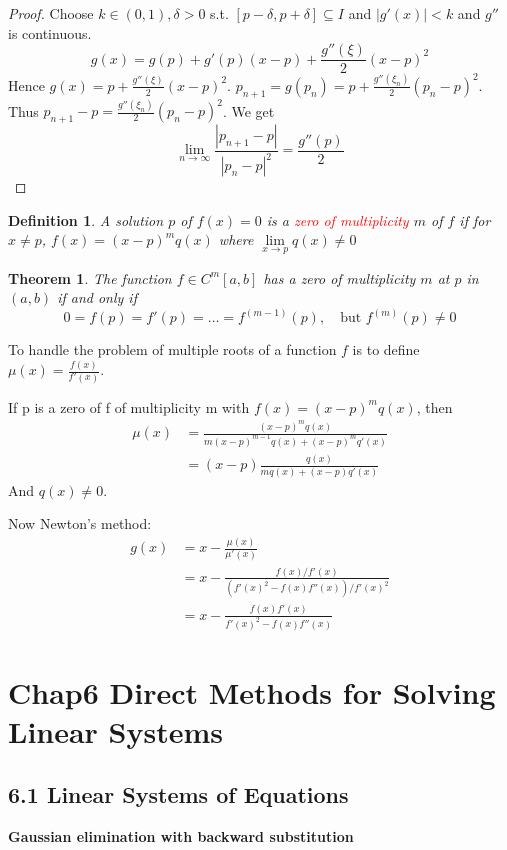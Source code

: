 \documentclass[11pt]{article}
\newtheorem{theorem}{Theorem}[section]
\newtheorem{definition}{Definition}[section]
\begin{document}
\begin{proof}
Choose $k\in(0,1),\delta>0$ s.t. $[p-\delta,p+\delta]\subseteq I$ and
$|g'(x)|<k$ and $g''$ is continuous.
\begin{equation*}
g(x)=g(p)+g'(p)(x-p)+\frac{g''(\xi)}{2}(x-p)^2
\end{equation*}
Hence $g(x)=p+\frac{g''(\xi)}{2}(x-p)^2$.
$p_{n+1}=g(p_n)=p+\frac{g''(\xi_n)}{2}(p_n-p)^2$. Thus
$p_{n+1}-p=\frac{g''(\xi_n)}{2}(p_n-p)^2$. We get
\begin{equation*}
\lim\limits_{n\to\infty}\frac{|p_{n+1}-p|}{|p_n-p|^2}=\frac{g''(p)}{2}
\end{equation*}
\end{proof}

\begin{definition}
A solution $p$ of $f(x) = 0$ is a \textcolor{red}{zero of multiplicity} $m$
of $f$ if for $x\neq p$, $f(x)=(x-p)^mq(x)$ where $\lim\limits_{x\to
p}q(x)\neq 0$
\end{definition}

\begin{theorem}
The function $f\in C^m[a,b]$ has a zero of multiplicity $m$ at $p$ in $(a,b)$
if and only if
\begin{equation*}
0=f(p)=f'(p)=\dots=f^{(m-1)}(p),\quad\text{but } f^{(m)}(p)\neq 0
\end{equation*}
\end{theorem}

To handle the problem of multiple roots of a function \(f\) is to define
\(\mu(x)=\frac{f(x)}{f'(x)}\).

If p is a zero of f of multiplicity m with \(f(x)=(x-p)^mq(x
)\), then
\begin{align*}
\mu(x)&=\frac{(x-p)^mq(x)}{m(x-p)^{m-1}q(x)+(x-p)^mq'(x)}\\
&=(x-p)\frac{q(x)}{mq(x)+(x-p)q'(x)}
\end{align*}
And \(q(x)\neq 0\).

Now Newton's method:
\begin{align*}
g(x)&=x-\frac{\mu(x)}{\mu'(x)}\\
&=x-\frac{f(x)/f'(x)}{(f'(x)^2-f(x)f''(x))/f'(x)^2}\\
&=x-\frac{f(x)f'(x)}{f'(x)^2-f(x)f''(x)}
\end{align*}
\section{Chap6 Direct Methods for Solving Linear Systems}
\label{sec:org0000473}
\subsection{6.1 Linear Systems of Equations}
\label{sec:org67a84c6}
\textbf{Gaussian elimination with backward substitution}
\end{document}
